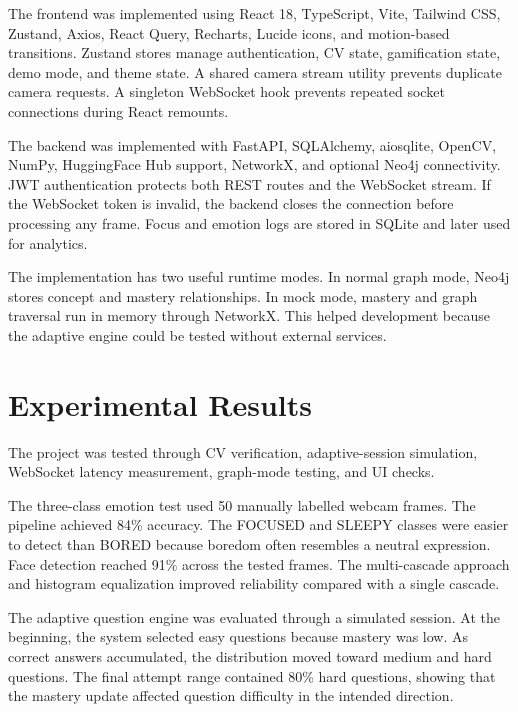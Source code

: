 \documentclass[conference]{IEEEtran}
\begin{document}


The frontend was implemented using React 18, TypeScript, Vite, Tailwind CSS, Zustand, Axios, React Query, Recharts, Lucide icons, and motion-based transitions. Zustand stores manage authentication, CV state, gamification state, demo mode, and theme state. A shared camera stream utility prevents duplicate camera requests. A singleton WebSocket hook prevents repeated socket connections during React remounts.

The backend was implemented with FastAPI, SQLAlchemy, aiosqlite, OpenCV, NumPy, HuggingFace Hub support, NetworkX, and optional Neo4j connectivity. JWT authentication protects both REST routes and the WebSocket stream. If the WebSocket token is invalid, the backend closes the connection before processing any frame. Focus and emotion logs are stored in SQLite and later used for analytics.

The implementation has two useful runtime modes. In normal graph mode, Neo4j stores concept and mastery relationships. In mock mode, mastery and graph traversal run in memory through NetworkX. This helped development because the adaptive engine could be tested without external services.

\section{Experimental Results}

The project was tested through CV verification, adaptive-session simulation, WebSocket latency measurement, graph-mode testing, and UI checks.



The three-class emotion test used 50 manually labelled webcam frames. The pipeline achieved 84\% accuracy. The FOCUSED and SLEEPY classes were easier to detect than BORED because boredom often resembles a neutral expression. Face detection reached 91\% across the tested frames. The multi-cascade approach and histogram equalization improved reliability compared with a single cascade.

The adaptive question engine was evaluated through a simulated session. At the beginning, the system selected easy questions because mastery was low. As correct answers accumulated, the distribution moved toward medium and hard questions. The final attempt range contained 80\% hard questions, showing that the mastery update affected question difficulty in the intended direction.
\end{document}
